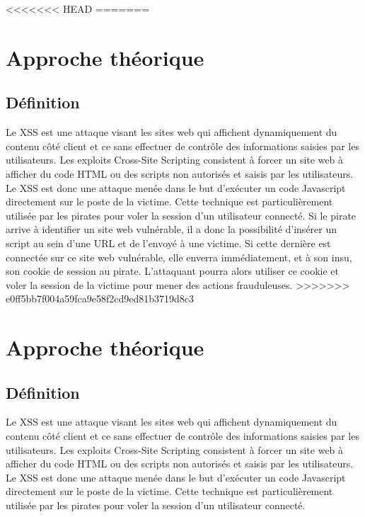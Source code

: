 \documentclass[a4paper,12pt]{report}
\begin{document}
<<<<<<< HEAD
=======
    \newpage

  \chapter{Approche théorique} %
  \section{Définition}
Le XSS est une attaque visant les sites web qui affichent dynamiquement du contenu côté client et ce sans effectuer de contrôle des informations saisies par les utilisateurs. Les exploits Cross-Site Scripting consistent à forcer un site web à afficher du code HTML ou des scripts non autorisés et saisis par les utilisateurs. Le XSS est donc une attaque menée dans le but d'exécuter un code Javascript directement sur le poste de la victime. Cette technique est particulièrement utilisée par les pirates pour voler la session d'un utilisateur connecté.
Si le pirate arrive à identifier un site web vulnérable, il a donc la possibilité d’insérer un script au sein d’une URL et de l’envoyé à une victime. Si cette dernière est connectée sur ce site web vulnérable, elle enverra immédiatement, et à son insu, son cookie de session au pirate. L'attaquant pourra alors utiliser ce cookie et voler la session de la victime pour mener des actions frauduleuses.
>>>>>>> e0ff5bb7f004a59fca9e58f2cd9ed81b3719d8c3


    \newpage

  \chapter{Approche théorique} %
  \section{Définition}

  Le XSS est une attaque visant les sites web qui affichent dynamiquement du contenu côté client et ce sans effectuer de contrôle des informations saisies par les utilisateurs. Les exploits Cross-Site Scripting consistent à forcer un site web à afficher du code HTML ou des scripts non autorisés et saisis par les utilisateurs. Le XSS est donc une attaque menée dans le but d'exécuter un code Javascript directement sur le poste de la victime. Cette technique est particulièrement utilisée par les pirates pour voler la session d'un utilisateur connecté.
\end{document}
